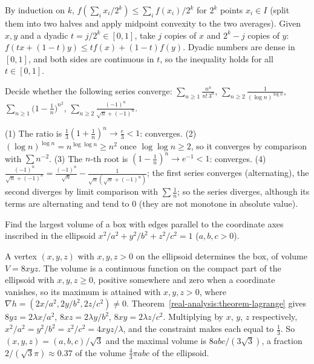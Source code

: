 \begin{solution}
By induction on $k$, $f(\sum_ix_i/2^k) \leq \sum_if(x_i)/2^k$ for $2^k$ points $x_i \in I$ (split them into two halves and apply midpoint convexity to the two averages). Given $x, y$ and a dyadic
$t = j/2^k \in [0, 1]$, take $j$ copies of $x$ and $2^k - j$ copies of $y$: $f(tx + (1 - t)y) \leq tf(x) + (1 - t)f(y)$. Dyadic numbers are dense in $[0, 1]$, and both sides are continuous in
$t$, so the inequality holds for all $t \in [0, 1]$.
\end{solution}

\begin{exercise}\label{real-analysis:exercise-series-tests}
Decide whether the following series converge: $\sum_{n \geq 1}\frac{n^n}{n!\,3^n}$, $\sum_{n \geq 2}\frac{1}{(\log n)^{\log n}}$, $\sum_{n \geq 1}\bigl(1 - \frac1n\bigr)^{n^2}$,
$\sum_{n \geq 2}\frac{(-1)^n}{\sqrt n + (-1)^n}$.
\end{exercise}

\begin{solution}
(1) The ratio is $\frac13(1 + \frac1n)^n \to \frac e3 < 1$: converges. (2) $(\log n)^{\log n} = n^{\log\log n} \geq n^2$ once $\log\log n \geq 2$, so it converges by comparison with $\sum n^{-2}$.
(3) The $n$-th root is $(1 - \frac1n)^n \to e^{-1} < 1$: converges. (4) $\frac{(-1)^n}{\sqrt n + (-1)^n} = \frac{(-1)^n}{\sqrt n} - \frac{1}{\sqrt n(\sqrt n + (-1)^n)}$; the first series converges
(alternating), the second diverges by limit comparison with $\sum\frac1n$; so the series diverges, although its terms are alternating and tend to $0$ (they are not monotone in absolute value).
\end{solution}

\begin{exercise}\label{real-analysis:exercise-box-ellipsoid}
Find the largest volume of a box with edges parallel to the coordinate axes inscribed in the ellipsoid $x^2/a^2 + y^2/b^2 + z^2/c^2 = 1$ ($a, b, c > 0$).
\end{exercise}

\begin{solution}
A vertex $(x, y, z)$ with $x, y, z > 0$ on the ellipsoid determines the box, of volume $V = 8xyz$. The volume is a continuous function on the compact part of the ellipsoid with $x, y, z \geq 0$, positive
somewhere and zero when a coordinate vanishes, so its maximum is attained with $x, y, z > 0$, where $\nabla h = (2x/a^2, 2y/b^2, 2z/c^2) \neq 0$. Theorem~\ref{real-analysis:theorem-lagrange} gives
$8yz = 2\lambda x/a^2$, $8xz = 2\lambda y/b^2$, $8xy = 2\lambda z/c^2$. Multiplying by $x$, $y$, $z$ respectively, $x^2/a^2 = y^2/b^2 = z^2/c^2 = 4xyz/\lambda$, and the constraint makes each equal to
$\frac13$. So $(x, y, z) = (a, b, c)/\sqrt3$ and the maximal volume is $8abc/(3\sqrt3)$, a fraction $2/(\sqrt3\pi) \approx 0.37$ of the volume $\frac43\pi abc$ of the ellipsoid.
\end{solution}

